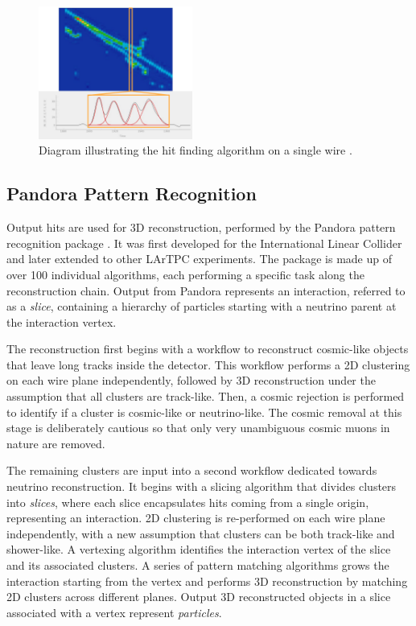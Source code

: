 \begin{figure}[htbp!] 
\centering    
\includegraphics[width=0.45\textwidth]{gaushit}
\caption[Hit Finding Diagram]{
Diagram illustrating the hit finding algorithm on a single wire \cite{EdPhD}.
}
\label{fig:gaushit}
\end{figure}

\subsection{Pandora Pattern Recognition}
\label{sec:pandora}

Output hits are used for 3D reconstruction, performed by the Pandora pattern recognition package \cite{pandora}.
It was first developed for the International Linear Collider and later extended to other LArTPC experiments.
The package is made up of over 100 individual algorithms, each performing a specific task along the reconstruction chain.
Output from Pandora represents an interaction, referred to as a \textit{slice}, containing a hierarchy of particles starting with a neutrino parent at the interaction vertex.

The reconstruction first begins with a workflow to reconstruct cosmic-like objects that leave long tracks inside the detector.
This workflow performs a 2D clustering on each wire plane independently, followed by 3D reconstruction under the assumption that all clusters are track-like.
Then, a cosmic rejection is performed to identify if a cluster is cosmic-like or neutrino-like.
The cosmic removal at this stage is deliberately cautious so that only very unambiguous cosmic muons in nature are removed.

The remaining clusters are input into a second workflow dedicated towards neutrino reconstruction.
It begins with a slicing algorithm that divides clusters into \textit{slices}, where each slice encapsulates hits coming from a single origin, representing an interaction.
2D clustering is re-performed on each wire plane independently, with a new assumption that clusters can be both track-like and shower-like.
A vertexing algorithm identifies the interaction vertex of the slice and its associated clusters.
A series of pattern matching algorithms grows the interaction starting from the vertex and performs 3D reconstruction by matching 2D clusters across different planes.
Output 3D reconstructed objects in a slice associated with a vertex represent \textit{particles}.

